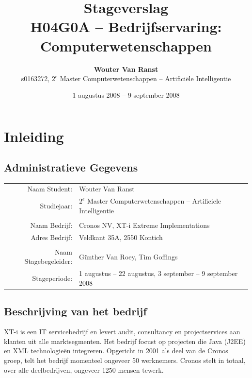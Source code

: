 \documentclass[a4paper,12pt]{report}
\begin{document}
\title{
	\textbf{Stageverslag} \\ 
	\normalsize{H04G0A -- Bedrijfservaring: Computerwetenschappen}}
	

\author{
	\textbf{Wouter Van Ranst} \\ 
	s0163272, $2^{e}$ Master Computerwetenschappen -- Artificiële Intelligentie}

\date{1 augustus 2008 -- 9 september 2008}

\maketitle

\tableofcontents

\chapter{Inleiding}
	\section{Administratieve Gegevens}
	
\begin{table}[htbp]
  \begin{tabular}{rl}
    Naam Student: 	& Wouter Van Ranst \\
	Studiejaar: &	$2^{e}$ Master Computerwetenschappen -- Artificiele Intelligentie \\	\\
	Naam Bedrijf:	& Cronos NV, XT-i Extreme Implementations \\
    Adres Bedrijf:	& Veldkant 35A, 2550 Kontich \\
	\\
	Naam Stagebegeleider:	& Günther Van Roey, Tim Goffings \\
	Stageperiode:	& 1 augustus -- 22 augustus, 3 september -- 9 september 2008
  \end{tabular}
\end{table}
	
	\section{Beschrijving van het bedrijf}
XT-i is een IT servicebedrijf en levert audit, consultancy en projectservices aan klanten uit alle marktsegmenten. Het bedrijf focust op projecten die Java (J2EE) en XML technologieën integreren. Opgericht in 2001 als deel van de Cronos groep, telt het bedrijf momenteel ongeveer 50 werknemers. Cronos stelt in totaal, over alle deelbedrijven, ongeveer 1250 mensen tewerk.
\end{document}
